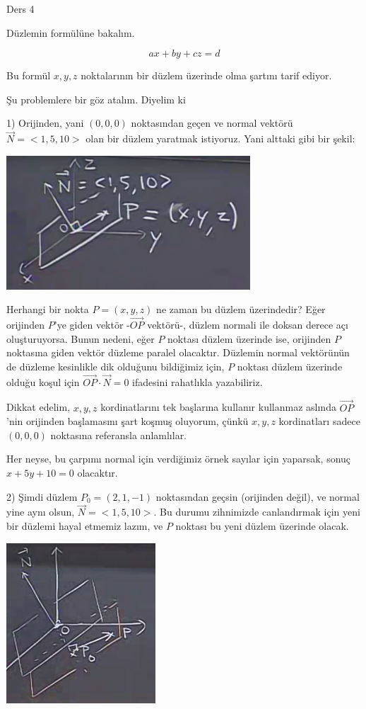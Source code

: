\documentclass[12pt,fleqn]{article}\usepackage{../../common}
\begin{document}
Ders 4

Düzlemin formülüne bakalım.

$$ ax + by + cz = d $$

Bu formül $x,y,z$ noktalarının bir düzlem üzerinde olma şartını tarif
ediyor. 

Şu problemlere bir göz atalım. Diyelim ki 

1) Orijinden, yani $(0,0,0)$ noktasından geçen ve normal vektörü $\vec{N} =
< 1,5,10 >$ olan bir düzlem yaratmak istiyoruz. Yani alttaki gibi bir şekil:

\includegraphics[height=5cm]{4_1.jpg}

Herhangi bir nokta $P = (x,y,z)$ ne zaman bu düzlem üzerindedir? Eğer orijinden
$P$'ye giden vektör -$\vec{OP}$ vektörü-, düzlem normali ile doksan derece açı
oluşturuyorsa. Bunun nedeni, eğer $P$ noktası düzlem üzerinde ise, orijinden $P$
noktasına giden vektör düzleme paralel olacaktır. Düzlemin normal vektörünün de
düzleme kesinlikle dik olduğunu bildiğimiz için, $P$ noktası düzlem üzerinde
olduğu koşul için $\vec{OP} \cdot \vec{N} = 0$ ifadesini rahatlıkla yazabiliriz.

Dikkat edelim, $x,y,z$ kordinatlarını tek başlarına kullanır kullanmaz aslında
$\vec{OP}$'nin orijinden başlamasını şart koşmuş oluyorum, çünkü $x,y,z$
kordinatları sadece $(0,0,0)$ noktasına referansla anlamlılar.

Her neyse, bu çarpımı normal için verdiğimiz örnek sayılar için yaparsak,
sonuç $x+5y+10 = 0$ olacaktır.

2) Şimdi düzlem $P_0 = (2,1,-1)$ noktasından geçsin (orijinden değil), ve normal
yine aynı olsun, $\vec{N} = < 1,5,10 >$. Bu durumu zihnimizde canlandırmak için
yeni bir düzlemi hayal etmemiz lazım, ve $P$ noktası bu yeni düzlem üzerinde
olacak.

\includegraphics[height=6cm]{4_2.png}
\end{document}

